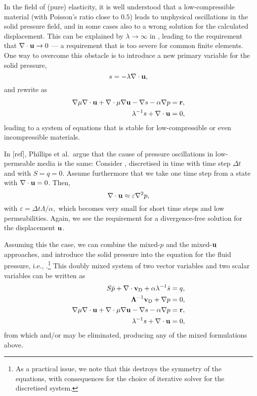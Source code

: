In the field of (pure) elasticity, it is well understood that a
low-compressible material (with Poisson's ratio close to $0.5$) leads to
unphysical oscillations in the solid pressure field, and in some cases also to
a wrong solution for the calculated displacement.
This can be explained by $\lambda\rightarrow\infty$ in , leading to
the requirement that $\nabla\cdot\U\rightarrow 0$ --- a requirement that is too
severe for common finite elements.
One way to overcome this obstacle is to introduce a new primary variable for
the solid pressure,
\begin{equation}
\label{eq:s}
s = -\lambda \nabla \cdot \U,
\end{equation}
and rewrite  as
\begin{align}
\nabla \mu \nabla \cdot \U + \nabla \cdot \mu \nabla \U
 - \nabla s - \alpha \nabla p &= \V{r},\\
\lambda^{-1}s+\nabla\cdot\U &= 0,
\end{align}
leading to a system of equations that is stable for low-compressible or even
incompressible materials.

In [ref], Phillips et al.~argue that the cause of pressure oscillations in
low-permeable media is the same: Consider , discretised in time
with time step $\Delta t$ and with $S=q=0$.
Assume furthermore that we take one time step from a state with
$\nabla\cdot\U=0$.
Then,
\begin{equation}
  \nabla\cdot\U \approx \varepsilon \onabla^2 p,
\end{equation}
with $\varepsilon=\Delta t \Lambda / \alpha,$ which becomes very small for
short time steps and low permeabilities.
Again, we see the requirement for a divergence-free solution for the
displacement $\mathbf{u}$.

Assuming this the case, we can combine the mixed-$p$ and the mixed-$\mathbf{u}$
approaches, and introduce the solid pressure into the equation for the fluid
pressure, i.e., .\footnote{As a practical issue, we note
  that this destroys the symmetry of the equations, with consequences for the
  choice of iterative solver for the discretised system.}
This doubly mixed system of two vector variables and two scalar variables can be
written as
\begin{align}
S\dot{p} + \nabla \cdot \vD + \alpha \lambda^{-1} \dot{s} &= q, \\
\label{eq:mixp}
  \Lambda^{-1} \vD + \nabla p &= 0,\\
\nabla \mu \nabla \cdot \U + \nabla \cdot \mu \nabla \U
 - \nabla s - \alpha \nabla p &= \V{r},\\
\label{eq:mixu}
\lambda^{-1}s+\nabla\cdot\U &= 0,
\end{align}
from which  and/or  may be eliminated, producing any of
the mixed formulations above.

